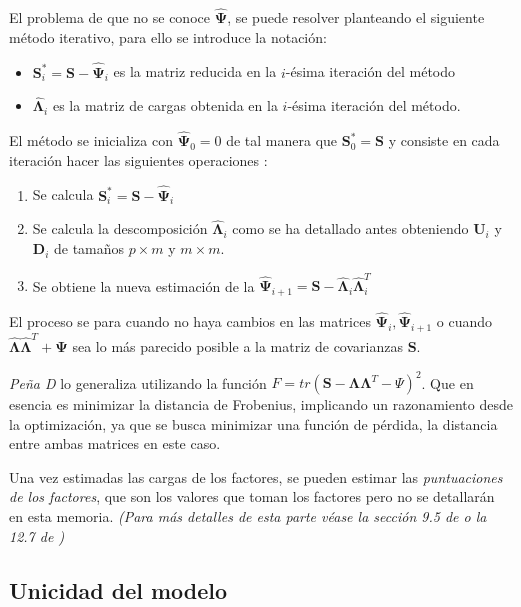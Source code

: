 \noindent El problema de que no se conoce $\mathbf{\hat{\Psi}}$, se puede resolver planteando el siguiente método iterativo, para ello se introduce la notación:
\begin{itemize}
\item $\mathbf{S}_i^*=\mathbf{S}-\hat{\mathbf{\Psi}}_i$ es la matriz reducida en la $i$-ésima iteración del método
\item $\mathbf{\hat{\Lambda}}_i$ es la matriz de cargas obtenida en la $i$-ésima iteración del método. 
\end{itemize}
\noindent El método se inicializa con $\mathbf{\hat{\Psi}}_0=0$ de tal manera que $\mathbf{S}_0^*=\mathbf{S}$ y consiste en cada iteración hacer las siguientes operaciones \cite{Johnson 2007, Peña 2002, Cuadras 2014}: 
\begin{enumerate}
\item Se calcula $\mathbf{S}_i^*=\mathbf{S-\hat{\Psi}}_i$
\item Se calcula la descomposición $\mathbf{\hat{\Lambda}}_i$ como se ha detallado antes obteniendo $\mathbf{U}_i$ y $\mathbf{D}_i$ de tamaños $p\times m $ y $m\times m$. 
\item Se obtiene la nueva estimación de la $\mathbf{\hat{\Psi}}_{i+1}=\mathbf{S}-\mathbf{\hat{\Lambda}}_i\mathbf{\hat{\Lambda}}_i^T$
\end{enumerate}

\noindent El proceso se para cuando no haya cambios en las matrices $\mathbf{\hat{\Psi}}_i,\mathbf{\hat{\Psi}}_{i+1}$ o cuando $\mathbf{\hat{\Lambda}}\mathbf{\hat{\Lambda}}^T+\mathbf{\Psi}$ sea lo más parecido posible a la matriz de covarianzas $\mathbf{S}$.

\noindent \emph{Peña D} \cite{Peña 2002} lo generaliza utilizando la función $F=tr(\mathbf{S}-\mathbf{\Lambda}\mathbf{\Lambda}^T-\Psi)^2$. Que en esencia es minimizar la distancia de Frobenius, implicando un razonamiento desde la optimización, ya que se busca minimizar  una función de pérdida, la distancia entre ambas matrices en este caso. 

\noindent Una vez estimadas las cargas de los factores, se pueden estimar las \emph{puntuaciones de los factores}, que son los valores que toman los factores pero no se detallarán en esta memoria.  \emph{(Para más detalles de esta parte véase  la sección 9.5 de \cite{Johnson 2007} o la 12.7 de \cite{Peña 2002})}

\subsection{Unicidad del modelo}

